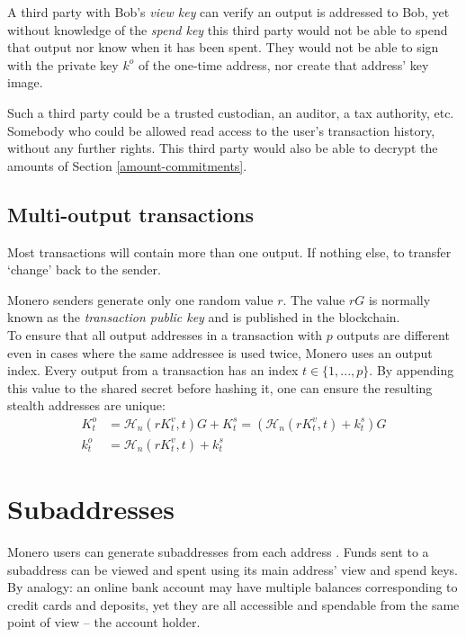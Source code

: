 A third party with Bob’s {\em view key} can verify an output is addressed to Bob, yet without knowledge of the {\em spend key} this third party would not be able to spend that output nor know when it has been spent. They would not be able to sign with the private key $k^o$ of the one-time address, nor create that address' key image.

Such a third party could be a trusted custodian, an auditor, a tax authority, etc. Somebody who could be allowed read access to the user’s transaction history, without any further rights. This third party would also be able to decrypt the amounts of Section \ref{amount-commitments}.


\subsection{Multi-output transactions}
\label{sec:multi_out_transactions}

Most transactions will contain more than one output. If nothing else, to transfer `change’ back to the sender.

Monero senders generate only one random value $r$. The value $r G$ is normally known as the {\em transaction public key} and is published in the blockchain.\\

To ensure that all output addresses in a transaction with $p$ outputs are different even in cases where the same addressee is used twice, Monero uses an output index. Every output from a transaction has an index $t \in \{1, ..., p\}$. By appending this value to the shared secret before hashing it, one can ensure the resulting stealth addresses are unique:\\
\begin{align*}
  K_t^o &= \mathcal{H}_n(r K_t^v, t)G + K_t^s = (\mathcal{H}_n(r K_t^v, t) + k_t^s)G  \\ 
  k_t^o &= \mathcal{H}_n(r K_t^v, t) + k_t^s
\end{align*} 

\section{Subaddresses}
\label{sec:subaddresses}

Monero users can generate subaddresses from each address \cite{MRL-0006}. Funds sent to a subaddress can be viewed and spent using its main address’ view and spend keys. By analogy: an online bank account may have multiple balances corresponding to credit cards and deposits, yet they are all accessible and spendable from the same point of view – the account holder.\\

